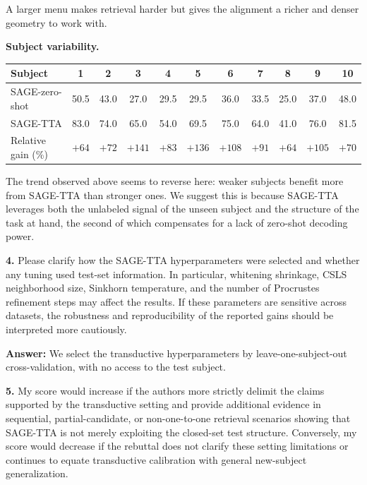 \documentclass[11pt]{article}
\newcommand{\answer}[1]{{\textbf{Answer:} \color{blue} #1}}
\begin{document}
{A larger menu makes retrieval harder but gives the alignment a richer and denser geometry to work with.

\textbf{Subject variability.}

\begin{center}
\small
\begin{tabular}{lcccccccccc}
\hline
Subject & 1 & 2 & 3 & 4 & 5 & 6 & 7 & 8 & 9 & 10 \\
\hline
SAGE-zero-shot & 50.5 & 43.0 & 27.0 & 29.5 & 29.5 & 36.0 & 33.5 & 25.0 & 37.0 & 48.0 \\
SAGE-TTA & 83.0 & 74.0 & 65.0 & 54.0 & 69.5 & 75.0 & 64.0 & 41.0 & 76.0 & 81.5 \\
Relative gain (\%) & $+64$ & $+72$ & $+141$ & $+83$ & $+136$ & $+108$ & $+91$ & $+64$ & $+105$ & $+70$ \\
\hline
\end{tabular}
\end{center}

The trend observed above seems to reverse here: weaker subjects benefit more from SAGE-TTA than stronger ones. We suggest this is because SAGE-TTA leverages both the unlabeled signal of the unseen subject and the structure of the task at hand, the second of which compensates for a lack of zero-shot decoding power.

}

\textbf{4.} Please clarify how the SAGE-TTA hyperparameters were selected and whether any tuning used
test-set information. In particular, whitening shrinkage, CSLS neighborhood size, Sinkhorn
temperature, and the number of Procrustes refinement steps may affect the results. If these parameters
are sensitive across datasets, the robustness and reproducibility of the reported gains should be
interpreted more cautiously.

\answer{
We select the transductive hyperparameters by leave-one-subject-out cross-validation, with no access to
the test subject. 
}

\textbf{5.} My score would increase if the authors more strictly delimit the claims supported by the
transductive setting and provide additional evidence in sequential, partial-candidate, or
non-one-to-one retrieval scenarios showing that SAGE-TTA is not merely exploiting the closed-set test
structure. Conversely, my score would decrease if the rebuttal does not clarify these setting
limitations or continues to equate transductive calibration with general new-subject generalization.
\end{document}
